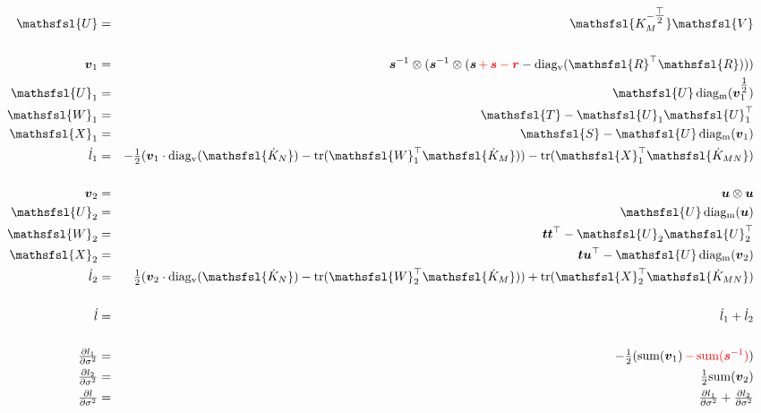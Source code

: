 \documentclass[12pt]{article}
\newcommand{\red}{\textcolor{red}}
\newcommand{\onehalf}{\tfrac{1}{2}}
\newcommand{\mat}[1]{\mbox{$\mathsfsl{#1}$}}
\newcommand{\myvec}[1]{\mbox{\boldmath$#1$}}
\newcommand{\diagv}[1]{\mathrm{diag_v}(#1)}
\newcommand{\diagm}[1]{\mathrm{diag_m}(#1)}
\newcommand{\trace}[1]{\mathrm{tr}(#1)}
\newcommand{\transm}[1]{\mat{#1}^\top}
\newcommand{\icholt}[1]{\mat{#1^{-\tfrac{\top}{2}}}}
\newcommand{\dKm}{\mat{\dot{K}_M}}
\newcommand{\dKn}{\mat{\dot{K}_N}}
\newcommand{\dKmn}{\mat{\dot{K}_{MN}}}
\newcommand{\dl}{\dot{l}}
\newcommand{\vecr}{\myvec{r}}
\newcommand{\vecs}{\myvec{s}}
\newcommand{\vect}{\myvec{t}}
\newcommand{\vecvx}{\myvec{v}_1}
\newcommand{\vecvy}{\myvec{v}_2}
\newcommand{\vecu}{\myvec{u}}
\newcommand{\vecis}{\myvec{s}^{-1}}
\newcommand{\matR}{\mat{R}}
\newcommand{\matS}{\mat{S}}
\newcommand{\matT}{\mat{T}}
\newcommand{\matU}{\mat{U}}
\newcommand{\matUx}{\mat{U}_1}
\newcommand{\matUy}{\mat{U}_2}
\newcommand{\matWx}{\mat{W}_1}
\newcommand{\matXx}{\mat{X}_1}
\newcommand{\matWy}{\mat{W}_2}
\newcommand{\matXy}{\mat{X}_2}
\begin{document}
\begin{eqnarray*}
\matU & = & \icholt{K_M}\mat{V} \\
\\
\vecvx & = & \vecis \otimes (\vecis \otimes (\vecs \red{\, + \, \vecs - \vecr} - \diagv{\transm{R}\matR})) \\
\matUx & = & \matU \, \diagm{\vecvx^{\onehalf}} \\
\matWx & = & \matT - \matUx{\matU}_1^\top \\
\matXx & = & \matS - \matU\,\diagm{\vecvx} \\
\dl_1 & = & -\onehalf(\vecvx \cdot \diagv{\dKn} - \trace{\transm{W}_1\dKm}) - \trace{\transm{X}_1\dKmn} \\
\\
\vecvy & = & \vecu \otimes \vecu \\
\matUy & = & \matU \, \diagm{\vecu} \\
\matWy & = & \vect \vect^\top - \matUy\matUy^\top \\
\matXy & = & \vect\vecu^\top - \matU\,\diagm{\vecvy} \\
\dl_2 & = & \onehalf(\vecvy \cdot \diagv{\dKn} - \trace{\transm{W}_2\dKm}) + \trace{\transm{X}_2\dKmn} \\
\\
\dl & = & \dl_1 + \dl_2 \\
\\
\tfrac{\partial l_1}{\partial\sigma^2} & = & -\onehalf(\mathrm{sum}(\vecvx) \red{\, - \, \mathrm{sum}(\vecis)}) \\
\tfrac{\partial l_2}{\partial\sigma^2} & = & \onehalf\mathrm{sum}(\vecvy) \\
\tfrac{\partial l}{\partial\sigma^2} & = & \tfrac{\partial l_1}{\partial\sigma^2} + \tfrac{\partial l_2}{\partial\sigma^2} \\
\end{eqnarray*}
\end{document}

